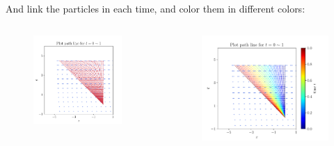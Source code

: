 \documentclass[11pt,]{beamer}
\begin{document}
\begin{frame}
	And link the particles in each time, and color them in different colors: 
	\begin{columns}[t]
		\begin{column}{0.49\textwidth}
			\begin{figure}
			\includegraphics[page=1, width=0.9\textwidth]{flow-(-y,0)-path-links.pdf}
			\end{figure}
		\end{column}
		\begin{column}{0.51\textwidth}
			\begin{figure}
			\includegraphics[page=1, width=1.0\textwidth]{flow-(-y,0)-path-color.pdf}
			\end{figure}
		\end{column}
	\end{columns}
\end{frame}
\end{document}
